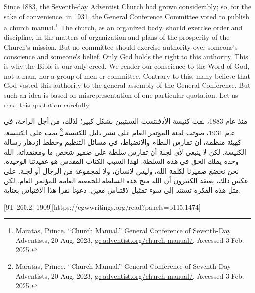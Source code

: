 Since 1883, the Seventh-day Adventist Church had grown considerably; so, for the sake of convenience, in 1931, the General Conference Committee voted to publish a church manual.\footnote{Maratas, Prince. “Church Manual.” General Conference of Seventh-Day Adventists, 20 Aug. 2023, \href{https://gc.adventist.org/church-manual/}{gc.adventist.org/church-manual/}. Accessed 3 Feb. 2025.} The church, as an organized body, should exercise order and discipline, in the matters of organization and plans of the prosperity of the Church's mission. But no committee should exercise authority over someone’s conscience and someone’s belief. Only God holds the right to this authority. This is why the Bible is our only creed. We render our conscience to the Word of God, not a man, nor a group of men or committee. Contrary to this, many believe that God vested this authority to the general assembly of the General Conference. But such an idea is based on misrepresentation of one particular quotation. Let us read this quotation carefully.


منذ عام 1883، نمت كنيسة الأدفنتست السبتيين بشكل كبير؛ لذلك، من أجل الراحة، في عام 1931، صوتت لجنة المؤتمر العام على نشر دليل للكنيسة.\footnote{Maratas, Prince. “Church Manual.” General Conference of Seventh-Day Adventists, 20 Aug. 2023, \href{https://gc.adventist.org/church-manual/}{gc.adventist.org/church-manual/}. Accessed 3 Feb. 2025.} يجب على الكنيسة، كهيئة منظمة، أن تمارس النظام والانضباط، في مسائل التنظيم وخطط ازدهار رسالة الكنيسة. لكن لا ينبغي لأي لجنة أن تمارس سلطة على ضمير شخص ما ومعتقداته. الله وحده يملك الحق في هذه السلطة. لهذا السبب الكتاب المقدس هو عقيدتنا الوحيدة. نحن نخضع ضميرنا لكلمة الله، وليس لإنسان، ولا لمجموعة من الرجال أو لجنة. على عكس ذلك، يعتقد الكثيرون أن الله منح هذه السلطة للجمعية العامة للمؤتمر العام. لكن مثل هذه الفكرة تستند إلى سوء تمثيل لاقتباس معين. دعونا نقرأ هذا الاقتباس بعناية.


[9T 260.2; 1909][https://egwwritings.org/read?panels=p115.1474]


